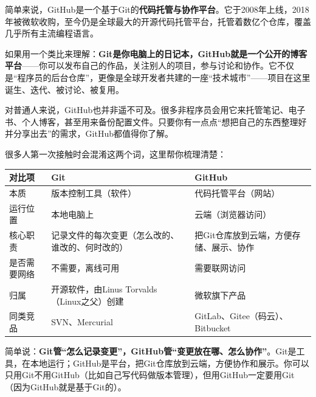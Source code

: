 


简单来说，GitHub是一个基于Git的\textbf{代码托管与协作平台}。它于2008年上线，2018年被微软收购，至今仍是全球最大的开源代码托管平台，托管着数亿个仓库，覆盖几乎所有主流编程语言。

如果用一个类比来理解：\textbf{Git是你电脑上的日记本，GitHub就是一个公开的博客平台}——你可以发布自己的作品，关注别人的项目，参与讨论和协作。它不仅是“程序员的后台仓库”，更像是全球开发者共建的一座“技术城市”——项目在这里诞生、迭代、被讨论、被复用。

对普通人来说，GitHub也并非遥不可及。很多非程序员会用它来托管笔记、电子书、个人博客，甚至用来备份配置文件。只要你有一点点“想把自己的东西整理好并分享出去”的需求，GitHub都值得你了解。


很多人第一次接触时会混淆这两个词，这里帮你梳理清楚：

\begin{center}
\begin{tabularx}{\linewidth}{|X|X|X|}
\hline
\textbf{对比项} & \textbf{Git} & \textbf{GitHub} \tabularnewline
\hline
本质 & 版本控制工具（软件） & 代码托管平台（网站） \tabularnewline
运行位置 & 本地电脑上 & 云端（浏览器访问） \tabularnewline
核心职责 & 记录文件的每次变更（怎么改的、谁改的、何时改的） & 把Git仓库放到云端，方便存储、展示、协作 \tabularnewline
是否需要网络 & 不需要，离线可用 & 需要联网访问 \tabularnewline
归属 & 开源软件，由Linus Torvalds（Linux之父）创建 & 微软旗下产品 \tabularnewline
同类竞品 & SVN、Mercurial & GitLab、Gitee（码云）、Bitbucket \tabularnewline
\hline
\end{tabularx}
\end{center}

简单说：\textbf{Git管“怎么记录变更”，GitHub管“变更放在哪、怎么协作”}。Git是工具，在本地运行；GitHub是平台，把Git仓库放到云端，方便协作和展示。你可以只用Git不用GitHub（比如自己写代码做版本管理），但用GitHub一定要用Git（因为GitHub就是基于Git的）。


